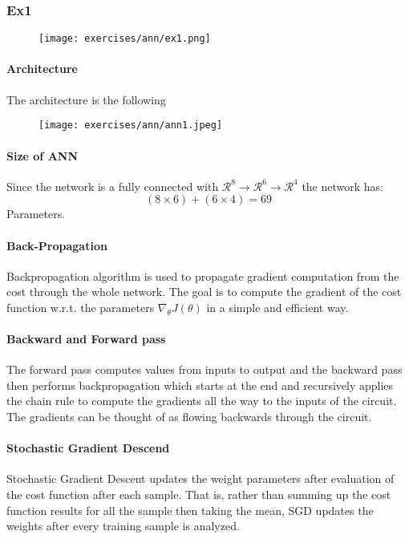 \subsubsection{Ex1}
\begin{figure}[H]
    \centering
    \texttt{[image: exercises/ann/ex1.png]}
\end{figure}


\paragraph{Architecture}
The architecture is the following
\begin{figure}[H]
    \centering
    \texttt{[image: exercises/ann/ann1.jpeg]}
\end{figure}

\paragraph{Size of ANN}
Since the network is a fully connected with $\mathcal{R}^8\rightarrow\mathcal{R}^6\to \mathcal{R}^4$ the network has:
\[(8 \times 6)+(6\times 4)=69\]
Parameters.



\paragraph{Back-Propagation}
Backpropagation algorithm is used to propagate gradient computation from the cost through the whole network. The goal is to compute the gradient of the cost function w.r.t. the parameters $\nabla_{\theta}J(\theta)$ in a simple and efficient way.

\paragraph{Backward and Forward pass}
The forward pass computes values from inputs to output and the backward pass then performs backpropagation which starts at the end and recursively applies the chain rule to compute the gradients all the way to the inputs of the circuit. The gradients can be thought of as flowing backwards through the circuit.


\paragraph{Stochastic Gradient Descend}
Stochastic Gradient Descent updates the weight parameters after evaluation of the cost function after each sample.  That is, rather than summing up the cost function results for all the sample then taking the mean, SGD updates the weights after every training sample is analyzed.

